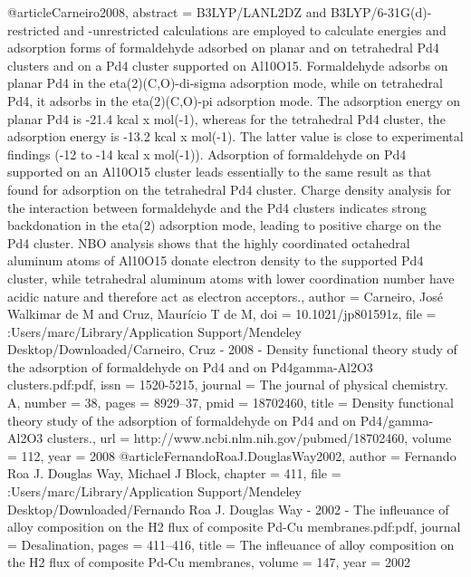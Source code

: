 @article{Carneiro2008,
abstract = {B3LYP/LANL2DZ and B3LYP/6-31G(d)-restricted and -unrestricted calculations are employed to calculate energies and adsorption forms of formaldehyde adsorbed on planar and on tetrahedral Pd4 clusters and on a Pd4 cluster supported on Al10O15. Formaldehyde adsorbs on planar Pd4 in the eta(2)(C,O)-di-sigma adsorption mode, while on tetrahedral Pd4, it adsorbs in the eta(2)(C,O)-pi adsorption mode. The adsorption energy on planar Pd4 is -21.4 kcal x mol(-1), whereas for the tetrahedral Pd4 cluster, the adsorption energy is -13.2 kcal x mol(-1). The latter value is close to experimental findings (-12 to -14 kcal x mol(-1)). Adsorption of formaldehyde on Pd4 supported on an Al10O15 cluster leads essentially to the same result as that found for adsorption on the tetrahedral Pd4 cluster. Charge density analysis for the interaction between formaldehyde and the Pd4 clusters indicates strong backdonation in the eta(2) adsorption mode, leading to positive charge on the Pd4 cluster. NBO analysis shows that the highly coordinated octahedral aluminum atoms of Al10O15 donate electron density to the supported Pd4 cluster, while tetrahedral aluminum atoms with lower coordination number have acidic nature and therefore act as electron acceptors.},
author = {Carneiro, Jos{\'{e}} Walkimar de M and Cruz, Maur{\'{i}}cio T de M},
doi = {10.1021/jp801591z},
file = {:Users/marc/Library/Application Support/Mendeley Desktop/Downloaded/Carneiro, Cruz - 2008 - Density functional theory study of the adsorption of formaldehyde on Pd4 and on Pd4gamma-Al2O3 clusters.pdf:pdf},
issn = {1520-5215},
journal = {The journal of physical chemistry. A},
number = {38},
pages = {8929--37},
pmid = {18702460},
title = {{Density functional theory study of the adsorption of formaldehyde on Pd4 and on Pd4/gamma-Al2O3 clusters.}},
url = {http://www.ncbi.nlm.nih.gov/pubmed/18702460},
volume = {112},
year = {2008}
}
@article{FernandoRoaJ.DouglasWay2002,
author = {{Fernando Roa  J. Douglas Way}, Michael J Block},
chapter = {411},
file = {:Users/marc/Library/Application Support/Mendeley Desktop/Downloaded/Fernando Roa J. Douglas Way - 2002 - The infleuance of alloy composition on the H2 flux of composite Pd-Cu membranes.pdf:pdf},
journal = {Desalination},
pages = {411--416},
title = {{The infleuance of alloy composition on the H2 flux of composite Pd-Cu membranes}},
volume = {147},
year = {2002}
}
